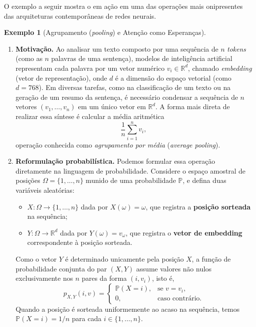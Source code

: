 \documentclass[12pt,portuguese]{article}
\theoremstyle{definition}
\newtheorem{example}[example]{Exemplo}
\begin{document}
O exemplo a seguir mostra o  em ação em uma das
operações mais onipresentes das arquiteturas contemporâneas de redes neurais.

\begin{example}[Agrupamento (\emph{pooling}) e Atenção como Esperanças]\label{ex:atencao-esperanca}

\begin{enumerate}
\item \textbf{Motivação.} Ao analisar um texto composto por uma sequência de $n$
\emph{tokens} (como as $n$ palavras de uma sentença), modelos de inteligência
artificial representam cada palavra por um vetor numérico $v_i\in\mathbb{R}^d$,
chamado \emph{embedding} (vetor de representação), onde $d$ é a dimensão do
espaço vetorial (como $d=768$). Em diversas tarefas, como na classificação de um
texto ou na geração de um resumo da sentença, é necessário condensar a
sequência de $n$ vetores $(v_1,\ldots,v_n)$ em um único vetor em $\mathbb{R}^d$.
A forma mais direta de realizar essa síntese é calcular a média aritmética
\[
\frac{1}{n}\sum_{i=1}^{n}v_i,
\]
operação conhecida como \emph{agrupamento por média} (\emph{average pooling}).

\item \textbf{Reformulação probabilística.} Podemos formular essa operação
diretamente na linguagem de probabilidade. Considere o espaço amostral de
posições $\Omega=\{1,\ldots,n\}$ munido de uma probabilidade $\mathbb{P}$, e
defina duas variáveis aleatórias:
\begin{itemize}
\item $X:\Omega\to\{1,\ldots,n\}$ dada por $X(\omega)=\omega$, que registra a
\textbf{posição sorteada} na sequência;
\item $Y:\Omega\to\mathbb{R}^d$ dada por $Y(\omega)=v_\omega$, que registra o
\textbf{vetor de embedding} correspondente à posição sorteada.
\end{itemize}
Como o vetor $Y$ é determinado unicamente pela posição $X$, a função de
probabilidade conjunta do par $(X,Y)$ assume valores não nulos exclusivamente
nos $n$ pares da forma $(i,v_i)$, isto é,
\[
p_{X,Y}(i,v) = 
\begin{cases}
\mathbb{P}(X=i), & \text{se } v=v_i, \\
0, & \text{caso contrário.}
\end{cases}
\]
Quando a posição é sorteada uniformemente ao acaso na sequência, temos
$\mathbb{P}(X=i)=1/n$ para cada $i\in\{1,\ldots,n\}$.


\end{enumerate}
\end{example}
\end{document}
